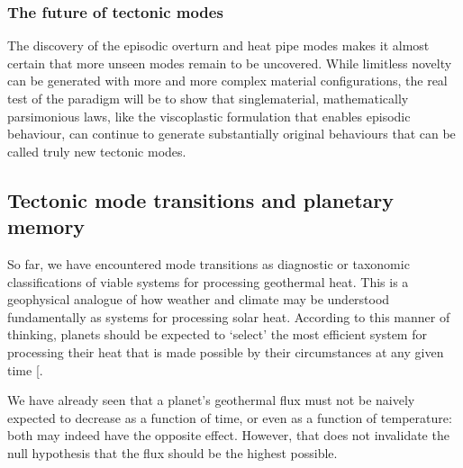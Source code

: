 \documentclass[letterpaper,10pt,english]{jupyterBook}
\begin{document}
\subsubsection{The future of tectonic modes}
\label{\detokenize{content/chapter_01_background/main:the-future-of-tectonic-modes}}
\sphinxAtStartPar
The discovery of the episodic overturn and heat pipe modes makes it almost certain that more unseen modes remain to be uncovered. While limitless novelty can be generated with more and more complex material configurations, the real test of the paradigm will be to show that single\sphinxhyphen{}material, mathematically parsimonious laws, like the viscoplastic formulation that enables episodic behaviour, can continue to generate substantially original behaviours that can be called truly new tectonic modes.


\subsection{Tectonic mode transitions and planetary memory}
\label{\detokenize{content/chapter_01_background/main:tectonic-mode-transitions-and-planetary-memory}}
\sphinxAtStartPar
So far, we have encountered mode transitions as diagnostic or taxonomic classifications of viable systems for processing geothermal heat. This is a geophysical analogue of how weather and climate may be understood fundamentally as systems for processing solar heat. According to this manner of thinking, planets should be expected to ‘select’ the most efficient system for processing their heat that is made possible by their circumstances at any given time {[}\sphinxcite{references:id625}{]}.

\sphinxAtStartPar
We have already seen that a planet’s geothermal flux must not be naively expected to decrease as a function of time, or even as a function of temperature: both may indeed have the opposite effect. However, that does not invalidate the null hypothesis that the flux should be the highest possible.
\end{document}
